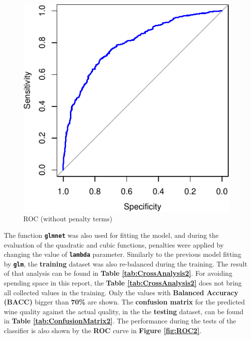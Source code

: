 \documentclass[a4paperpaper,9pt,twocolumn,twoside,printwatermark=false]{pinp}
\begin{document}
\begin{figure}

{\centering \includegraphics{WineQualityAnalysis_files/figure-latex/ROC1-1} 

}

\caption{ROC (without penalty terms)}\label{fig:ROC1}
\end{figure}

The function \textbf{\texttt{glmnet}} was also used for fitting the
model, and during the evaluation of the quadratic and cubic functions,
penalties were applied by changing the value of \textbf{\texttt{lambda}}
parameter. Similarly to the previous model fitting by
\textbf{\texttt{glm}}, the \textbf{training} dataset was also
re-balanced during the training. The result of that analysis can be
found in \textbf{Table \ref{tab:CrossAnalysis2}}. For avoiding spending
space in this report, the \textbf{Table \ref{tab:CrossAnalysis2}} does
not bring all collected values in the training. Only the values with
\textbf{Balanced Accuracy (BACC)} bigger than \textbf{70\%} are shown.
The \textbf{confusion matrix} for the predicted wine quality against the
actual quality, in the the \textbf{testing} dataset, can be found in
\textbf{Table \ref{tab:ConfusionMatrix2}}. The performance during the
tests of the classifier is also shown by the \textbf{ROC} curve in
\textbf{Figure \ref{fig:ROC2}}.
\end{document}
